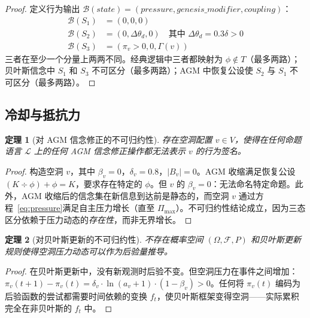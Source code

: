 \documentclass[11pt]{article}
\newtheorem{theorem}{定理}[section]
\begin{document}
\begin{proof}
定义行为输出 $\mathcal{B}(state) = (pressure, genesis\_modifier, coupling)$：
\begin{align}
\mathcal{B}(S_1) &= (0, 0, 0) \\
\mathcal{B}(S_2) &= (0, \Delta\theta_d, 0) \quad \text{其中 } \Delta\theta_d = 0.3\delta > 0 \\
\mathcal{B}(S_3) &= (\pi_v > 0, 0, \Gamma(v))
\end{align}
三者在至少一个分量上两两不同。经典逻辑中三者都映射为 $\phi \notin T$（最多两路）；贝叶斯信念中 $S_1$ 和 $S_3$ 不可区分（最多两路）；AGM 中恢复公设使 $S_2$ 与 $S_1$ 不可区分（最多两路）。
\end{proof}

\subsection{冷却与抵抗力}

\begin{theorem}[对 AGM 信念修正的不可归约性]
\label{thm:void-agm}
存在空洞配置 $v \in V$，使得在任何命题语言 $\mathcal{L}$ 上的任何 AGM 信念修正操作都无法表示 $v$ 的行为签名。
\end{theorem}

\begin{proof}
构造空洞 $v$，其中 $\beta_v = 0$，$\delta_v = 0.8$，$|B_v| = 0$。AGM 收缩满足恢复公设 $(K \div \phi) + \phi = K$，要求存在特定的 $\phi$。但 $v$ 的 $\beta_v = 0$：无法命名特定命题。此外，AGM 收缩后的信念集在新信息到达前是静态的，而空洞 $v$ 通过方程~\eqref{eq:pressure}满足自主压力增长（直至 $\Pi_{\max}$）。不可归约性结论成立，因为三态区分依赖于压力动态的\emph{存在性}，而非无界增长。
\end{proof}

\begin{theorem}[对贝叶斯更新的不可归约性]
\label{thm:void-bayes}
不存在概率空间 $(\Omega, \mathcal{F}, P)$ 和贝叶斯更新规则使得空洞压力动态可以作为后验量推导。
\end{theorem}

\begin{proof}
在贝叶斯更新中，没有新观测时后验不变。但空洞压力在事件之间增加：$\pi_v(t+1) - \pi_v(t) = \delta_v \cdot \ln(a_v + 1) \cdot (1 - \beta_v) > 0$。任何将 $\pi_v(t)$ 编码为后验函数的尝试都需要时间依赖的变换 $f_t$，使贝叶斯框架变得空洞——实际累积完全在非贝叶斯的 $f_t$ 中。
\end{proof}

\end{document}
